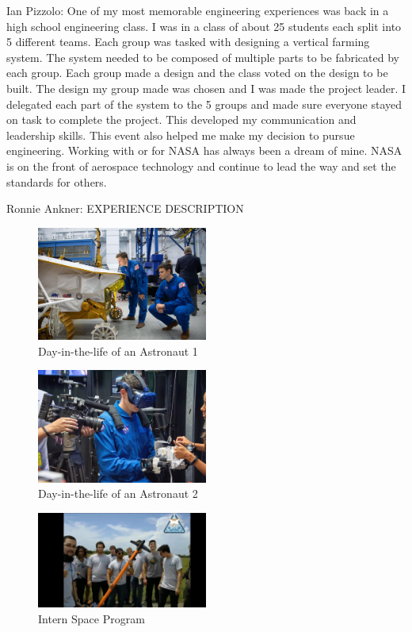 \documentclass{article}
\begin{document}
Ian Pizzolo: One of my most memorable engineering experiences was back in a high school engineering class. I was in a class of about 25 students each split into 5 different teams. Each group was tasked with designing a vertical farming system. The system needed to be composed of multiple parts to be fabricated by each group. Each group made a design and the class voted on the design to be built. The design my group made was chosen and I was made the project leader. I delegated each part of the system to the 5 groups and made sure everyone stayed on task to complete the project. This developed my communication and leadership skills. This event also helped me make my decision to pursue engineering. Working with or for NASA has always been a dream of mine. NASA is on the front of aerospace technology and continue to lead the way and set the standards for others.

Ronnie Ankner: EXPERIENCE DESCRIPTION

\begin{figure}[!htb]
  \centering
  \includegraphics[width=0.5\textwidth]{assets/staringatrover.jpg}
  \caption{Day-in-the-life of an Astronaut 1}
  \label{fig:staringatrover}
\end{figure}

\begin{figure}[!htb]
  \centering
  \includegraphics[width=0.5\textwidth]{assets/vrtest.png}
  \caption{Day-in-the-life of an Astronaut 2}
  \label{fig:vrtest}
\end{figure}

\begin{figure}[!htb]
  \centering
  \includegraphics[width=0.5\textwidth]{assets/ronnieandplane.png}
  \caption{Intern Space Program}
  \label{fig:ronnieandplane}
\end{figure}
\end{document}
